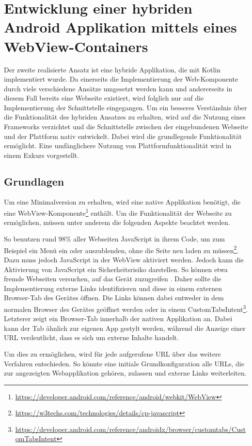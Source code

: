 \section{Entwicklung einer hybriden Android Applikation mittels eines WebView-Containers}
Der zweite realisierte Ansatz ist eine hybride Applikation, die mit Kotlin implementiert wurde. 
Da einerseits die Implementierung der Web-Komponente durch viele verschiedene Ansätze umgesetzt werden kann und andererseits in diesem Fall bereits eine Webseite existiert, wird folglich nur auf die Implementierung der Schnittstelle eingegangen. 
Um ein besseres Verständnis über die Funktionalität des hybriden Ansatzes zu erhalten, wird auf die Nutzung eines Frameworks verzichtet und die Schnittstelle zwischen der eingebundenen Webseite und der Plattform nativ entwickelt.
Dabei wird die grundlegende Funktionalität ermöglicht. Eine umfänglichere Nutzung von Plattformfunktionalität wird in einem Exkurs vorgestellt.

\subsection{Grundlagen}
Um eine Minimalversion zu erhalten, wird eine native Applikation benötigt, die eine WebView-Komponente\footnote{\url{https://developer.android.com/reference/android/webkit/WebView}} enthält. Um die Funktionalität der Webseite zu ermöglichen, müssen unter anderem die folgenden Aspekte beachtet werden.

So benutzen rund 98\% aller Webseiten JavaScript in ihrem Code, um zum Beispiel ein Menü ein oder auszublenden, ohne die Seite neu laden zu müssen\footnote{\url{https://w3techs.com/technologies/details/cp-javascript}}. 
Dazu muss jedoch JavaScript in der WebView aktiviert werden. 
Jedoch kann die Aktivierung von JavaScript ein Sicherheitsrisiko darstellen. So können etwa fremde Webseiten versuchen, auf das Gerät zuzugreifen \cite{webview_javascript_security}. 
Daher sollte die Implementierung externe Links identifizieren und diese in einem externen Browser-Tab des Gerätes öffnen.
Die Links können dabei entweder in dem normalen Browser des Gerätes geöffnet werden oder in einem CustomTabsIntent\footnote{\url{https://developer.android.com/reference/androidx/browser/customtabs/CustomTabsIntent}}.
Letzterer zeigt ein Browser-Tab innerhalb der nativen Applikation an. Dabei kann der Tab ähnlich zur eigenen App gestylt werden, während die Anzeige einer URL verdeutlicht, dass es sich um externe Inhalte handelt.

Um dies zu ermöglichen, wird für jede aufgerufene URL über das weitere Verfahren entschieden. So könnte eine initiale Grundkonfiguration alle URLs, die zur angezeigten Webapplikation gehören, zulassen und externe Links weiterleiten.

